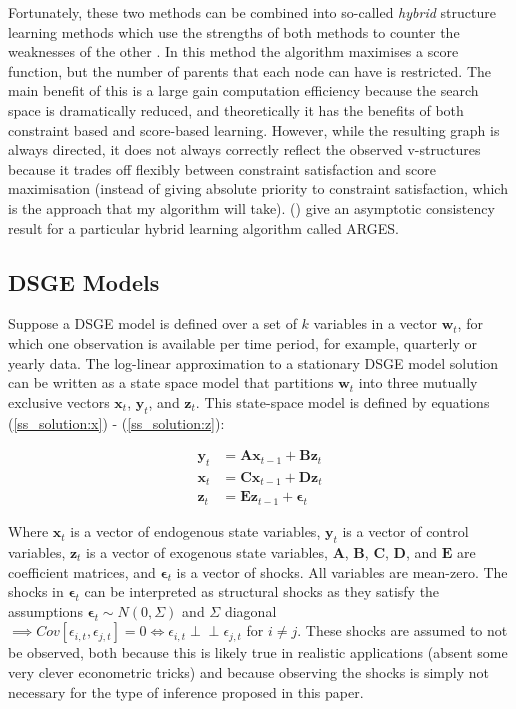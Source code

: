 \documentclass{article}
\def\indep{\perp \!\!\! \perp}
\begin{document}
Fortunately, these two methods can be combined into so-called \textit{hybrid} structure learning methods which use the strengths of both methods to counter the weaknesses of the other \parencite{scutari2014multiple} \parencite{friedman2013learning}. In this method the algorithm maximises a score function, but the number of parents that each node can have is restricted. The main benefit of this is a large gain computation efficiency because the search space is dramatically reduced, and theoretically it has the benefits of both constraint based and score-based learning. However, while the resulting graph is always directed, it does not always correctly reflect the observed v-structures because it trades off flexibly between constraint satisfaction and score maximisation (instead of giving absolute priority to constraint satisfaction, which is the approach that my algorithm will take). \citeauthor{nandy2018high} (\citeyear{nandy2018high}) give an asymptotic consistency result for a particular hybrid learning algorithm called ARGES.

\subsection{DSGE Models} \label{dsge}

Suppose a DSGE model is defined over a set of $k$ variables in a vector $\mathbf{w}_t$, for which one observation is available per time period, for example, quarterly or yearly data. The log-linear approximation to a stationary DSGE model solution can be written as a state space model \parencite{king1988production} that partitions $\mathbf{w}_t$ into three mutually exclusive vectors $\mathbf{x}_t$, $\mathbf{y}_t$, and $\mathbf{z}_t$. This state-space model is defined by equations (\ref{ss_solution:x}) - (\ref{ss_solution:z}):

\begin{align}
  \mathbf{y}_t &= \mathbf{A} \mathbf{x}_{t-1} + \mathbf{B} \mathbf{z}_{t} \label{ss_solution:x}\\
  \mathbf{x}_t &= \mathbf{C} \mathbf{x}_{t-1} + \mathbf{D} \mathbf{z}_{t} \label{ss_solution:y}\\
  \mathbf{z}_t &= \mathbf{E} \mathbf{z}_{t-1} + \mathbf{\epsilon}_{t} \label{ss_solution:z}
\end{align}

Where $\mathbf{x}_t$ is a vector of endogenous state variables, $\mathbf{y}_t$ is a vector of control variables, $\mathbf{z}_t$ is a vector of exogenous state variables, $\mathbf{A}$, $\mathbf{B}$, $\mathbf{C}$, $\mathbf{D}$, and $\mathbf{E}$ are coefficient matrices, and $\mathbf{\epsilon}_t$ is a vector of shocks. All variables are mean-zero. The shocks in $\mathbf{\epsilon}_t$ can be interpreted as structural shocks as they satisfy the assumptions $\mathbf{\epsilon}_{t} \sim N(0,\Sigma)$ and $\Sigma$ diagonal $\implies Cov[\epsilon_{i,t},\epsilon_{j,t}] = 0 \iff \epsilon_{i,t} \indep \epsilon_{j,t} $ for $i \not = j$. These shocks are assumed to not be observed, both because this is likely true in realistic applications (absent some very clever econometric tricks) and because observing the shocks is simply not necessary for the type of inference proposed in this paper.
\end{document}
